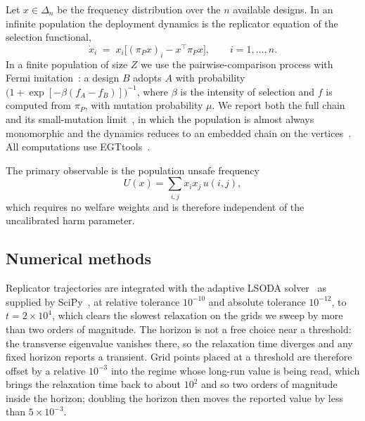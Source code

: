 \documentclass[pdflatex]{sn-jnl}
\theoremstyle{thmstyleone}
\theoremstyle{thmstylethree}
\theoremstyle{thmstyletwo}
\newcommand{\piP}{\pi_{P}}
\newcommand{\Simplex}{\Delta_{n}}
\begin{document}
Let $x\in\Simplex$ be the frequency distribution over the $n$ available
designs. In an infinite population the deployment dynamics is the replicator
equation of the selection functional,
\begin{equation}
\dot{x}_i \;=\; x_i\Big[(\piP x)_i - x^{\top}\piP x\Big],
\qquad i=1,\dots,n .
\label{eq:replicator}
\end{equation}
In a finite population of size $Z$ we use the pairwise-comparison process with
Fermi imitation~\citep{traulsen2006stochastic,traulsen2007pairwise}: a design
$B$ adopts $A$ with
probability $\big(1+\exp[-\beta(f_A-f_B)]\big)^{-1}$, where $\beta$ is the
intensity of selection and $f$ is computed from $\piP$, with mutation
probability $\mu$. We report both the full chain and its small-mutation limit~\citep{fudenberg2006imitation,imhof2005cycles}, in which the population is
almost always monomorphic and the dynamics reduces to an embedded chain on the
vertices~\citep{traulsen2009stochastic}. All computations use
EGTtools~\citep{domingos2023egttools}.

The primary observable is the population unsafe frequency
\begin{equation}
U(x)=\sum_{i,j} x_i x_j\, u(i,j),
\label{eq:U}
\end{equation}
which requires no welfare weights and is therefore independent of the
uncalibrated harm parameter.

\subsection{Numerical methods}\label{sec:numerics}

Replicator trajectories are integrated with the adaptive LSODA
solver~\citep{petzold1983lsoda} as supplied by
SciPy~\citep{virtanen2020scipy}, at
relative tolerance $10^{-10}$ and absolute tolerance $10^{-12}$, to
$t=2\times10^{4}$, which clears the slowest relaxation on the grids we sweep by
more than two orders of magnitude. The horizon is not a free choice near a
threshold: the transverse eigenvalue vanishes there, so the relaxation time
diverges and any fixed horizon reports a transient. Grid points placed at a
threshold are therefore offset by a relative $10^{-3}$ into the regime whose
long-run value is being read, which brings the relaxation time back to about
$10^{2}$ and so two orders of magnitude inside the horizon; doubling the
horizon then moves the reported value by less than $5\times10^{-3}$.
\end{document}

